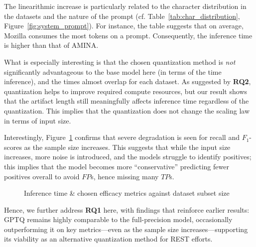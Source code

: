 \documentclass[conference]{IEEEtran}
\begin{document}
The linearithmic increase is particularly related to the character distribution in the datasets and the nature of the prompt (cf. Table~\ref{tab:char_distribution}, Figure~\ref{fig:system_prompt}). For instance, the table suggests that on average, Mozilla consumes the most tokens on a prompt. Consequently, the inference time is higher than that of AMINA.

What is especially interesting is that the chosen quantization method is \textit{not} significantly advantageous to the base model here (in terms of the time inference), and the times almost overlap for each dataset. As suggested by \textbf{RQ2}, quantization helps to improve required compute resources, but our result shows that the artifact length still meaningfully affects inference time regardless of the quantization. This implies that the quantization does not change the scaling law in terms of input size. 

Interestingly, Figure~\ref{fig:RQ3_charts} confirms that severe degradation is seen for recall and $F_1$-scores as the sample size increases. This suggests that while the input size increases, more noise is introduced, and the models struggle to identify positives; this implies that the model becomes more ``conservative'' predicting fewer positives overall to avoid $FP$s, hence missing many $TP$s.

\begin{figure}[H]
    \centering
    
    \caption{Inference time \& chosen efficacy metrics against dataset subset size}
    \label{fig:RQ3_charts}
\end{figure}

Hence, we further address \textbf{RQ1} here, with findings that reinforce earlier results: GPTQ remains highly comparable to the full-precision model, occasionally outperforming it on key metrics---even as the sample size increases---supporting its viability as an alternative quantization method for REST efforts.
\end{document}
